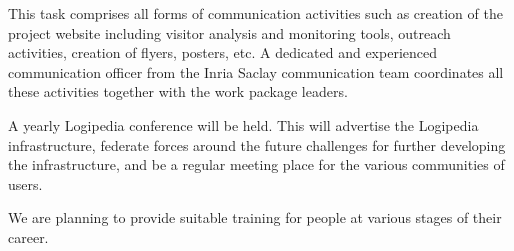 \begin{workpackage}[id=dissemination,type=MGT,wphases=1-48,
  short={Dissemination},
  title={Dissemination, communication and exploitation},
  lead=Lie,LieRM=3,InrRM=6,BirRM=4,CleRM=2,ImtRM=2,StrRM=2,ZibRM=14,EduRM=12]
\begin{tasklist}

  \begin{task}[id=com,
      title=Communication,
      shorttitle=Comm.,
      lead=Inr,InrRM=6,wphases=1-48!.25]
    This task comprises all forms of communication activities such as
    creation of the project website including visitor analysis and
    monitoring tools, outreach activities, creation of flyers,
    posters, etc.  A dedicated and experienced communication officer
    from the Inria Saclay communication team coordinates all these
    activities together with the work package leaders.
  \end{task}

  \begin{task}[id=dissem,
      title=Dissemination,
      shorttitle=Dissem.,
      lead=Lie,LieRM=3,wphases=1-48]
    A yearly Logipedia conference will be held.  This will advertise the
    Logipedia infrastructure, federate forces around the future challenges for
    further developing the infrastructure, and be a regular meeting place for
    the various communities of users.

  \end{task}

  \begin{task}[id=training,
      title=Training Logipedia developers and users,
      shorttitle=Train.,
      lead=Bir,BirRM=2,wphases=1-48!.05]
    We are planning to provide suitable training
    for people at various stages of their career.


\end{task}
\end{tasklist}
\end{workpackage}
